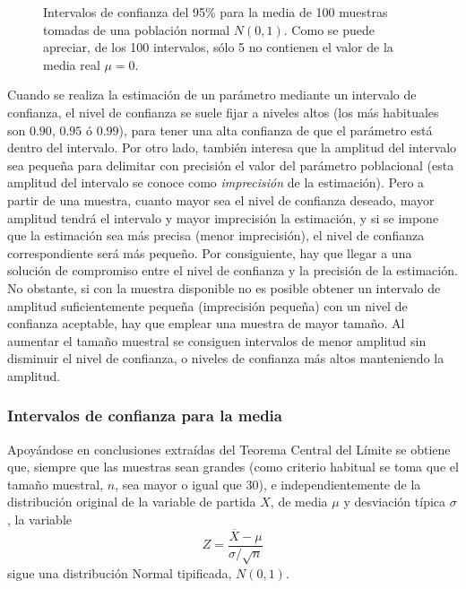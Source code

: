 \begin{figure}[h!]
\begin{center}
\scalebox{1}{}
\caption{Intervalos de confianza del 95\% para la media de 100 muestras
tomadas de una población normal $N(0,1)$. Como se puede apreciar, de los 100
intervalos, sólo 5 no contienen el valor de la media real $\mu=0$. }
\label{g:100intervalos}
\end{center}
\end{figure}

Cuando se realiza la estimación de un parámetro mediante un intervalo de confianza, el nivel de confianza se suele fijar
a niveles altos (los más habituales son $0.90$, $0.95$ ó $0.99$), para tener una alta confianza de que el parámetro está
dentro del intervalo. Por otro lado, también interesa que la amplitud del intervalo sea pequeña para delimitar con
precisión el valor del parámetro poblacional (esta amplitud del intervalo se conoce como \emph{imprecisión} de la
estimación). Pero a partir de una muestra, cuanto mayor sea el nivel de confianza deseado, mayor amplitud tendrá el
intervalo y mayor imprecisión la estimación, y si se impone que la estimación sea más precisa (menor imprecisión), el
nivel de confianza correspondiente será más pequeño. Por consiguiente, hay que llegar a una solución de compromiso entre
el nivel de confianza y la precisión de la estimación. No obstante, si con la muestra disponible no es posible obtener un
intervalo de amplitud suficientemente pequeña (imprecisión pequeña) con un nivel de confianza aceptable, hay que emplear
una muestra de mayor tamaño. Al aumentar el tamaño muestral se consiguen intervalos de menor amplitud sin disminuir el
nivel de confianza, o niveles de confianza más altos manteniendo la amplitud.


\subsubsection{Intervalos de confianza para la media}
Apoyándose en conclusiones extraídas del Teorema Central del Límite se obtiene que, siempre que las muestras sean grandes
(como criterio habitual se toma que el tamaño muestral, $n$, sea mayor o igual que 30), e independientemente de la
distribución original de la variable de partida $X$, de media $\mu$ y desviación típica $\sigma$, la variable \[
Z=\dfrac{\overline{X}-\mu }{\sigma/\sqrt{n}} \] sigue una distribución Normal tipificada, $N(0,1)$.

